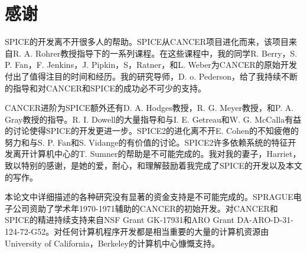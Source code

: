 \chapter*{感谢}
SPICE的开发离不开很多人的帮助。SPICE从CANCER项目进化而来，该项目来自R. A. Rohrer教授指导下的一系列课程。在这些课程中，我的同学R. Berry，S. P. Fan，F. Jenkins，J. Pipkin，S，Ratner，和L. Weber为CANCER的原始开发付出了值得注目的时间和经历。我的研究导师，D. o. Pederson，给了我持续不断的指导和对CANCER和SPICE的成功必不可少的支持。

CANCER进阶为SPICE额外还有D. A. Hodges教授，R. G. Meyer教授，和P. A. Gray教授的指导。R. I. Dowell的大量指导和与I. E. Getreau和W. G. McCalla有益的讨论使得SPICE的开发更进一步。SPICE2的进化离不开E. Cohen的不知疲倦的努力和与S. P. Fan和S. Vidange的有价值的讨论。SPICE2许多依赖系统的特征开发离开计算机中心的T. Sumner的帮助是不可能完成的。我对我的妻子，Harriet，致以特别的感谢，是她的爱，耐心，和理解鼓励着我完成了SPICE的开发以及本文的写作。

本论文中详细描述的各种研究没有显著的资金支持是不可能完成的。SPRAGUE电子公司资助了学术年1970-1971辅助的CANCER的初始开发。对CANCER和SPICE的精进持续支持来自NSF Grant GK-17931和ARO Grant DA-ARO-D-31-124-72-G52。对任何计算机程序开发都是相当重要的大量的计算机资源由University of California，Berkeley的计算机中心慷慨支持。